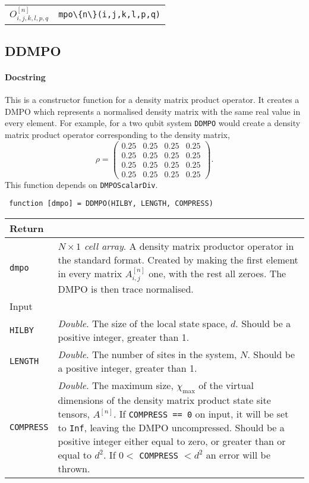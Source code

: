  \begin{tabu} to \linewidth {X[c]|X[c]}
  	\(O^{[n]}_{i,j,k,l,p,q}\) & \lstinline$mpo\{n\}(i,j,k,l,p,q)$
 \end{tabu}
 
 \subsection{DDMPO}
 \paragraph{Docstring} This is a constructor function for a density matrix product operator. It creates a DMPO which represents a normalised density matrix with the same real value in every element. For example, for a two qubit system \lstinline$DDMPO$ would create a density matrix product operator corresponding to the density matrix,
 \begin{equation}
 \rho = \begin{pmatrix}
 0.25 & 0.25 & 0.25 & 0.25 \\
 0.25 & 0.25 & 0.25 & 0.25 \\
 0.25 & 0.25 & 0.25 & 0.25 \\
 0.25 & 0.25 & 0.25 & 0.25 \end{pmatrix}.
 \label{eq:vs3-4}
 \end{equation} 
 This function depends on \lstinline$DMPOScalarDiv$.
 \begin{lstlisting}
 function [dmpo] = DDMPO(HILBY, LENGTH, COMPRESS) \end{lstlisting}
 \begin{longtabu}{X[1,l]X[4,l]}
 \hline
 Return & \\ \hline
 \lstinline$dmpo$ & \emph{\(N \times 1\) cell array}. A density matrix productor operator in the standard format. Created by making the first element in every matrix \(A^{[n]}_{i,j}\) one, with the rest all zeroes. The DMPO is then trace normalised.  \\ \hline
 Input & \\ \hline
 \lstinline$HILBY$ & \emph{Double}. The size of the local state space, \(d\). Should be a positive integer, greater than 1. \\
 \lstinline$LENGTH$ & \emph{Double}. The number of sites in the system, \(N\). Should be a positive integer, greater than 1. \\
 \lstinline$COMPRESS$ & \emph{Double}. The maximum size, \(\chi_{\mathrm{max}}\) of the virtual dimensions of the density matrix product state site tensors, \(A^{[n]}\). If \lstinline$COMPRESS == 0$ on input, it will be set to \lstinline$Inf$, leaving the DMPO uncompressed. Should be a positive integer either equal to zero, or greater than or equal to \(d^{2}\). If \(0 <\) \lstinline$COMPRESS$ \(< d^{2}\) an error will be thrown. \\
 \hline
 \end{longtabu}  
